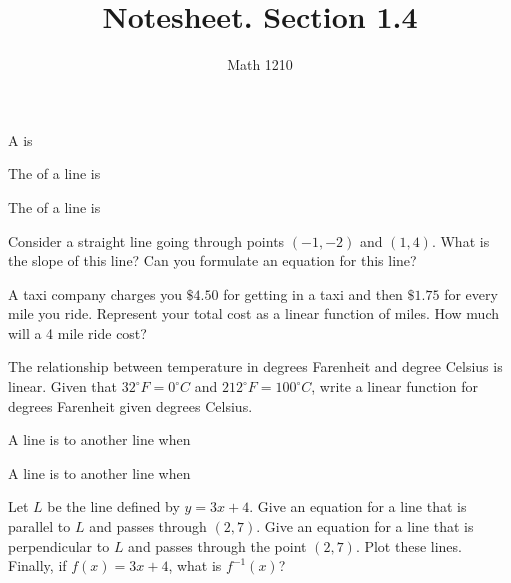\documentclass[12pt, a4paper]{article}
\author{Math 1210}
\title{Notesheet. Section 1.4}
\date{}
\begin{document}
\maketitle
\nameline
\begin{defi}
  A  is
\end{defi}
\begin{defi}
  The  of a line is
\end{defi}
\begin{defi}
  The  of a line is
\end{defi}
\begin{ex}
  Consider a straight line going through points \((-1,-2)\) and
  \((1,4)\). What is the slope of this line? Can you formulate an
  equation for this line?
\end{ex}
\begin{ex}
  A taxi company charges you \(\$4.50\) for getting in a taxi and
  then \(\$1.75\) for every mile you ride. Represent your
  total cost as a linear function of miles. How much will a 4 mile
  ride cost?
\end{ex}
\begin{ex}
  The relationship between temperature in degrees Farenheit and degree
  Celsius is linear. Given that \(32^\circ F = 0^\circ C\) and
  \(212^\circ F = 100^\circ C\), write a linear function for
  degrees Farenheit given degrees Celsius.
\end{ex}
\begin{defi}
  A line is  to another line when
\end{defi}
\begin{defi}
  A line is  to another line when
\end{defi}
\begin{ex}
  Let \(L\) be the line defined by \(y = 3x+4\). Give an equation for a
  line that is parallel to \(L\) and passes through \((2,7)\). Give an
  equation for a line that is perpendicular to \(L\) and passes
  through the point \((2,7)\). Plot these lines. Finally, if \(f(x) = 3x+4\), what is
  \(f^{-1}(x)\)?
\end{ex}
\end{document}
